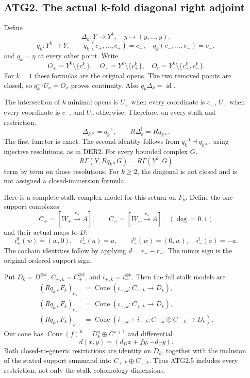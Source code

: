 \subsection{ATG2. The actual k-fold diagonal right
adjoint}\label{atg2.-the-actual-k-fold-diagonal-right-adjoint}

Define \[
\Delta_k:Y\to Y^k,\quad y\mapsto(y,\ldots,y),
\] \[
q_k:Y^k\to Y,\qquad
q_k(c_+,\ldots,c_+)=c_+,\quad
q_k(c_-,\ldots,c_-)=c_-,
\] and \(q_k=\eta\) at every other point. Write \[
O_+=Y^k\setminus\{c_-^k\},\quad
O_-=Y^k\setminus\{c_+^k\},\quad
O_\eta=Y^k\setminus\{c_+^k,c_-^k\}.
\tag{ATG2.1}
\] For \(k=1\) these formulas are the original opens. The two removed
points are closed, so \(q_k^{-1}U_x=O_x\) proves continuity. Also
\(q_k\Delta_k=\operatorname{id}\).

The intersection of \(k\) minimal opens is \(U_+\) when every coordinate
is \(c_+\), \(U_-\) when every coordinate is \(c_-\), and \(U_\eta\)
otherwise. Therefore, on every stalk and restriction, \[
\boxed{\Delta_{k*}=q_k^{-1},\qquad R\Delta_k^!=Rq_{k*}.}
\tag{ATG2.2}
\] The first functor is exact. The second identity follows from
\(q_k^{-1}\dashv q_{k*}\), using injective resolutions, as in DER2. For
every bounded complex \(G\), \[
R\Gamma(Y,Rq_{k*}G)=R\Gamma(Y^k,G)
\tag{ATG2.3}
\] term by term on those resolutions. For \(k\ge2\), the diagonal is not
closed and is not assigned a closed-immersion formula.

Here is a complete stalk-complex model for this return on \(F_k\).
Define the one-support complexes \[
C_+=[W_+\xrightarrow{r_+}A],\qquad
C_-=[W_-\xrightarrow{r_-}A]
\quad(\deg=0,1)
\] and their actual maps to \(D\): \[
i_+^0(w)=(w,0),\quad i_+^1(a)=a,\qquad
i_-^0(w)=(0,w),\quad i_-^1(a)=-a.
\tag{ATG2.4}
\] The cochain identities follow by applying \(d=r_+-r_-\). The minus
sign is the original ordered support sign.

Put \(D_k=D^{\otimes k}\), \(C_{\pm,k}=C_\pm^{\otimes k}\), and
\(i_{\pm,k}=i_\pm^{\otimes k}\). Then the full stalk models are \[
\begin{aligned}
(Rq_{k*}F_k)_{c_+}&=\operatorname{Cone}(i_{-,k}:C_{-,k}\to D_k),\\
(Rq_{k*}F_k)_{c_-}&=\operatorname{Cone}(i_{+,k}:C_{+,k}\to D_k),\\
(Rq_{k*}F_k)_\eta&=\operatorname{Cone}(i_{+,k}+i_{-,k}:
 C_{+,k}\oplus C_{-,k}\to D_k).
\end{aligned}
\tag{ATG2.5}
\] Our cone has \(\operatorname{Cone}(f)^n=D_k^n\oplus C^{n+1}\) and
differential \[
d(x,y)=(d_Dx+fy,-d_Cy).
\tag{ATG2.6}
\] Both closed-to-generic restrictions are identity on \(D_k\), together
with the inclusion of the stated support summand into
\(C_{+,k}\oplus C_{-,k}\). Thus ATG2.5 includes every restriction, not
only the stalk cohomology dimensions.

